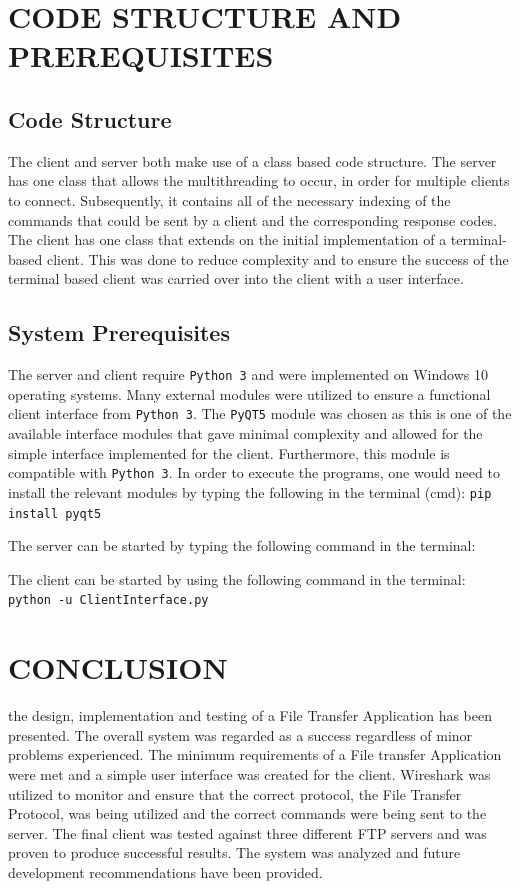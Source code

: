 \documentclass[10pt,twocolumn]{witseiepaper}
\def\code#1{\texttt{#1}}
\begin{document}
%
\section{CODE STRUCTURE AND PREREQUISITES}
\label{sec: CODE STRUCTURE AND PREREQUISITES}

\subsection{Code Structure}
\label{sec: Code Structure}
The client and server both make use of a class based code structure. The server has one class that allows the multithreading to occur, in order for multiple clients to connect. Subsequently, it contains all of the necessary indexing of the commands that could be sent by a client and the corresponding response codes. The client has one class that extends on the initial implementation of a terminal-based client. This was done to reduce complexity and to ensure the success of the terminal based client was carried over into the client with a user interface.

\subsection{System Prerequisites}
\label{sec: System Prerequisites}
The server and client require \code{Python 3} and were implemented on Windows 10 operating systems. Many external modules were utilized to ensure a functional client interface from \code{Python 3}. The \code{PyQT5} module was chosen as this is one of the available interface modules that gave minimal complexity and allowed for the simple interface implemented for the client. Furthermore, this module is compatible with \code{Python 3}. In order to execute the programs, one would need to install the relevant modules by typing the following in the terminal (cmd):
\code{pip install pyqt5}

The server can be started by typing the following command in the terminal:

The client can be started by using the following command in the terminal:
\code{python -u ClientInterface.py}

%
\section{CONCLUSION}
\label{sec: Conclusion}
the design, implementation and testing of a File Transfer Application has been presented. The overall system was regarded as a success regardless of minor problems experienced. The minimum requirements of a File transfer Application were met and a simple user interface was created for the client. Wireshark was utilized to monitor and ensure that the correct protocol, the File Transfer Protocol, was being utilized and the correct commands were being sent to the server. The final client was tested against three different FTP servers and was proven to produce successful results. The system was analyzed and future development recommendations have been provided.
\end{document}

